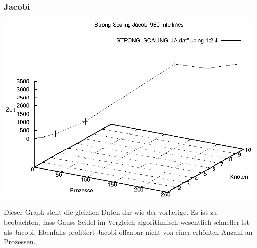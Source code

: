 \documentclass[a4paper,12pt]{scrartcl}
\begin{document}
\subsubsection{Jacobi}
\begin{multicols}{2}
\includegraphics[scale=0.5]{results/STRONG_SCALING_JA.eps}

\end{multicols}

Dieser Graph stellt die gleichen Daten dar wie der vorherige. Es ist zu
beobachten, dass Gauss-Seidel im Vergleich algorithmisch
wesentlich schneller ist als Jacobi.
Ebenfalls profitiert Jacobi offenbar nicht von einer erhöhten Anzahl an
Prozessen.
\end{document}
